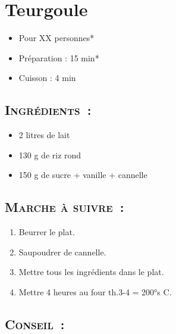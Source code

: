 \section{Teurgoule}

\begin{itemize}
\item Pour XX personnes*		%
\item Préparation : 15 min*		%
\item Cuisson : 4 min			%
\end{itemize}

\subsection*{\textsc{Ingrédients~:}}

\begin{itemize}
\item 2 litres de lait
\item 130 g de riz rond
\item 150 g de sucre + vanille + cannelle
\end{itemize}


\subsection*{\textsc{Marche à suivre~:}}

\begin{enumerate}
\item Beurrer le plat.
\item Saupoudrer de cannelle.
\item Mettre tous les ingrédients dans le plat.
\item Mettre 4 heures au four th.3-4 = 200°s C.
\end{enumerate}


\subsection*{\textsc{Conseil~:}}


